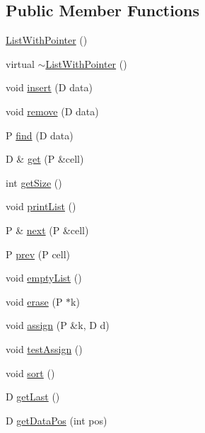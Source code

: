 \subsection*{Public Member Functions}
\begin{DoxyCompactItemize}
\item 
\hyperlink{classListWithPointer_a53b1284b13bf834bc5fc1eb27368a283}{List\+With\+Pointer} ()
\item 
virtual \hyperlink{classListWithPointer_ac0567286c62e3521fa5130f95010e779}{$\sim$\+List\+With\+Pointer} ()
\item 
void \hyperlink{classListWithPointer_a726958a731ead3b407d68a7e5a0bce54}{insert} (D data)
\item 
void \hyperlink{classListWithPointer_ab69e83d9e92619be09f9d8dde3e6cad0}{remove} (D data)
\item 
P \hyperlink{classListWithPointer_a2bb95a28a394bffd52a7f962cdde14dd}{find} (D data)
\item 
D \& \hyperlink{classListWithPointer_af2892238e8faed0b98d2473419a91f62}{get} (P \&cell)
\item 
int \hyperlink{classListWithPointer_ac70c49b5703887fd867e90cdac3c706f}{get\+Size} ()
\item 
void \hyperlink{classListWithPointer_a7079b5f1dbddb87a7e33ffc71ebb7b92}{print\+List} ()
\item 
P \& \hyperlink{classListWithPointer_a3aec82866e03a1f37175c4b0976eeb47}{next} (P \&cell)
\item 
P \hyperlink{classListWithPointer_ab3b37e6a31e0837884b91df6da682cc8}{prev} (P cell)
\item 
void \hyperlink{classListWithPointer_aec4f5374971962c79d397bbcd0080199}{empty\+List} ()
\item 
void \hyperlink{classListWithPointer_a0727a8a01df92681f13a74acd8dc2247}{erase} (P $\ast$k)
\item 
void \hyperlink{classListWithPointer_a5703464a7cd48d871e3bb04562a3d351}{assign} (P \&k, D d)
\item 
void \hyperlink{classListWithPointer_ab9cc0d6da9b9e1d40bb57c664a6477cd}{test\+Assign} ()
\item 
void \hyperlink{classListWithPointer_aa46631b2da29895d1f767626fb591bc8}{sort} ()
\item 
D \hyperlink{classListWithPointer_a6b404e952a0b924fc60f7d576a368421}{get\+Last} ()
\item 
D \hyperlink{classListWithPointer_a3fa92037b76b6fd3fb8c9702244eb7fb}{get\+Data\+Pos} (int pos)
\end{DoxyCompactItemize}
